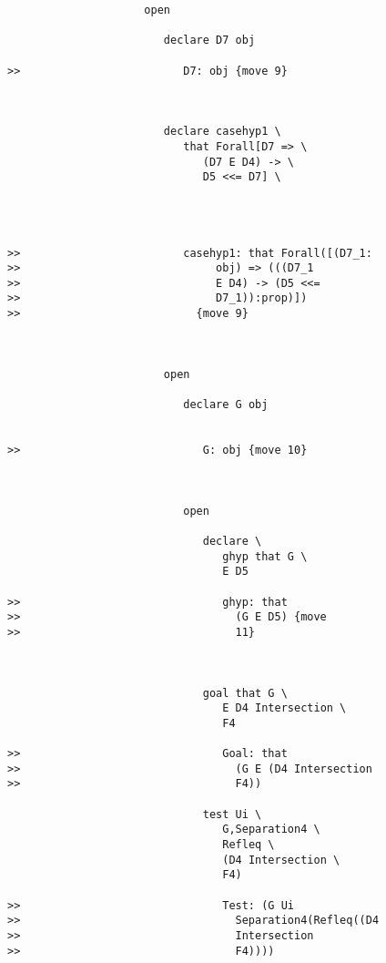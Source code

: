 \documentclass[12pt]{article}
\begin{document}
\begin{verbatim}
                     open

                        declare D7 obj

>>                         D7: obj {move 9}



                        declare casehyp1 \
                           that Forall[D7 => \
                              (D7 E D4) -> \
                              D5 <<= D7] \
                           



>>                         casehyp1: that Forall([(D7_1:
>>                              obj) => (((D7_1
>>                              E D4) -> (D5 <<=
>>                              D7_1)):prop)])
>>                           {move 9}



                        open

                           declare G obj


>>                            G: obj {move 10}



                           open

                              declare \
                                 ghyp that G \
                                 E D5

>>                               ghyp: that
>>                                 (G E D5) {move
>>                                 11}



                              goal that G \
                                 E D4 Intersection \
                                 F4

>>                               Goal: that
>>                                 (G E (D4 Intersection
>>                                 F4))

                              test Ui \
                                 G,Separation4 \
                                 Refleq \
                                 (D4 Intersection \
                                 F4)

>>                               Test: (G Ui
>>                                 Separation4(Refleq((D4
>>                                 Intersection
>>                                 F4))))


\end{verbatim}
\end{document}
